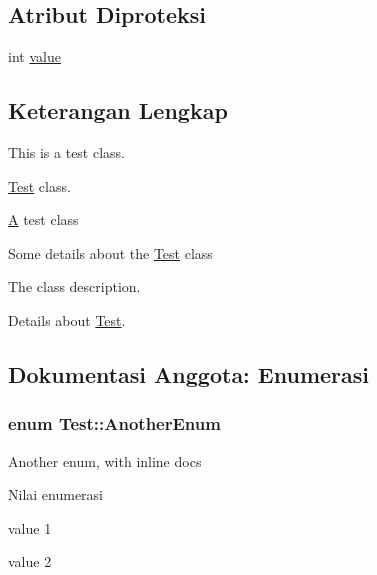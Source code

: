 \subsection*{Atribut Diproteksi}
\begin{DoxyCompactItemize}
\item 
int \hyperlink{classTest_ad55002283eba8ffa062dfb849f6c077c}{value}
\end{DoxyCompactItemize}


\subsection{Keterangan Lengkap}
This is a test class. 

\hyperlink{classTest}{Test} class.

\hyperlink{classA}{A} test class

Some details about the \hyperlink{classTest}{Test} class

The class description.

Details about \hyperlink{classTest}{Test}. 

\subsection{Dokumentasi Anggota\+: Enumerasi}
\hypertarget{classTest_a34b5b35cdcd492c108e62275d647bcf4}{}
\subsubsection[{Another\+Enum}]{\setlength{\rightskip}{0pt plus 5cm}enum {\bf Test\+::\+Another\+Enum}}\label{classTest_a34b5b35cdcd492c108e62275d647bcf4}
Another enum, with inline docs \begin{Desc}
\item[Nilai enumerasi]\par
\begin{description}
\item[{\em 
\hypertarget{classTest_a34b5b35cdcd492c108e62275d647bcf4a4250af92f4c971e7217dfa695b169d33}{}V1\label{classTest_a34b5b35cdcd492c108e62275d647bcf4a4250af92f4c971e7217dfa695b169d33}
}]value 1 \item[{\em 
\hypertarget{classTest_a34b5b35cdcd492c108e62275d647bcf4ac65e3839243b8dcbdf72157f108265b2}{}V2\label{classTest_a34b5b35cdcd492c108e62275d647bcf4ac65e3839243b8dcbdf72157f108265b2}
}]value 2 \end{description}
\end{Desc}
\hypertarget{classTest_a26bf93efdaea3c6e2cfa4119c3755d3f}{}
